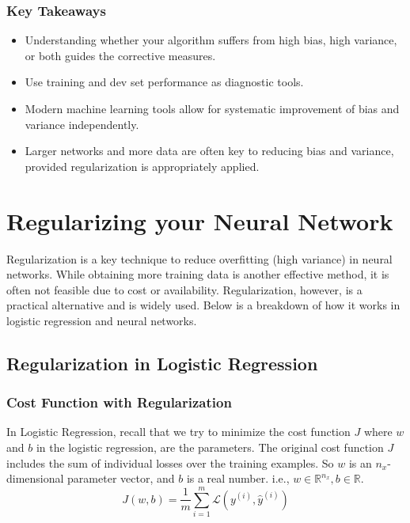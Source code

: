 \documentclass[letterpaper,12pt,notitlepage,twoside]{report}
\begin{document}
\subsubsection{Key Takeaways}
\begin{itemize}
    \item Understanding whether your algorithm suffers from high bias, high variance, or both guides the corrective measures.
    \item Use training and dev set performance as diagnostic tools.
    \item Modern machine learning tools allow for systematic improvement of bias and variance independently.
    \item Larger networks and more data are often key to reducing bias and variance, provided regularization is appropriately applied.
\end{itemize}

\section{Regularizing your Neural Network}
Regularization is a key technique to reduce overfitting (high variance) in neural networks. While obtaining more training data is another effective method, it is often not feasible due to cost or availability. Regularization, however, is a practical alternative and is widely used. Below is a breakdown of how it works in logistic regression and neural networks.

\subsection{Regularization in Logistic Regression}

\subsubsection*{Cost Function with Regularization}
In Logistic Regression, recall that we try to minimize the cost function $J$ where $w$ and $b$ in the logistic regression, are the parameters. The original cost function \( J \) includes the sum of individual losses over the training examples. So $w$ is an $n_x$-dimensional parameter vector, and $b$ is a real number. i.e., $w \in \mathbb{R}^{n_x}, b \in \mathbb{R}$.
\begin{equation}
J (w, b) = \frac{1}{m} \sum_{i=1}^m \mathcal{L} (y^{(i)}, \hat{y}^{(i)})
\end{equation}
\end{document}
